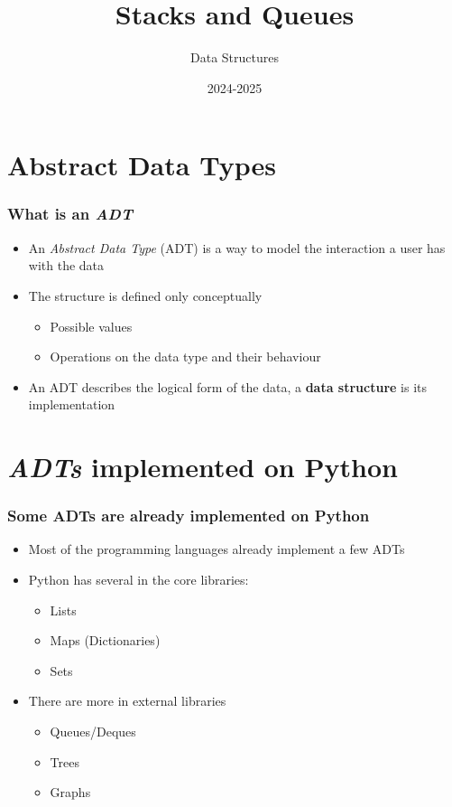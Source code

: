 \documentclass[11pt]{beamer}
\author{Data Structures}
\title{\huge{Stacks and Queues}}
\date[]{2024-2025}
\begin{document}
\begin{frame}[plain]
	\maketitle
\end{frame}

\begin{frame}
	\tableofcontents
\end{frame}

\section{Abstract Data Types}

\begin{frame}\frametitle{What is an \textit{ADT}}
\begin{itemize}
\item An \textit{Abstract Data Type} (ADT) is a way to model the interaction a user has with the data
\item The structure is defined only conceptually
    \begin{itemize}
    \item Possible values
    \item Operations on the data type and their behaviour
    \end{itemize}
\item An ADT describes the logical form of the data, a \textbf{data structure} is its implementation
\end{itemize}
\end{frame}

\section{\textit{ADTs} implemented on Python}

\begin{frame}\frametitle{Some ADTs are already implemented on Python}
\begin{itemize}
\item Most of the programming languages already implement a few ADTs
\item Python has several in the core libraries:
    \begin{itemize}
    \item Lists
    \item Maps (Dictionaries)
    \item Sets
    \end{itemize}
\item There are more in external libraries
    \begin{itemize}
    \item Queues/Deques
    \item Trees
    \item Graphs
    \end{itemize}
\end{itemize}
\end{frame}
\end{document}
